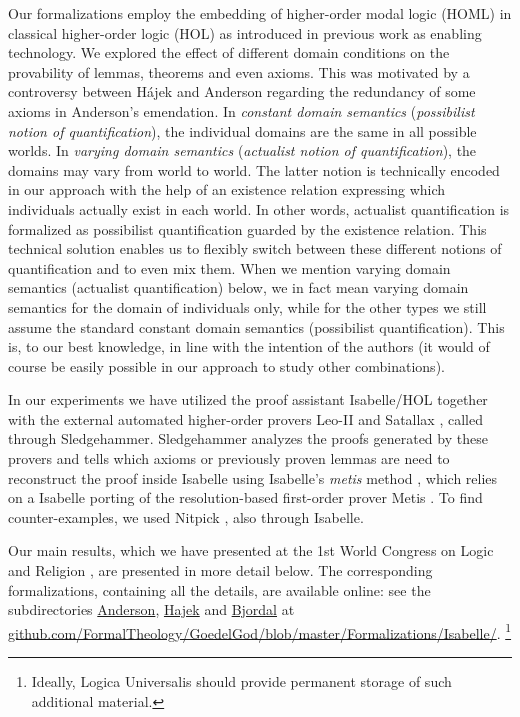 \documentclass{birkjour}
\theoremstyle{definition}
\theoremstyle{remark}
\numberwithin{equation}{section}
\begin{document}
Our formalizations employ the embedding of higher-order modal logic
(HOML) in classical higher-order logic (HOL) as introduced in previous
work \citep{C40,J23} as enabling technology.  We explored the effect
of different domain conditions on the provability of lemmas, theorems
and even axioms.  This was motivated by a controversy between Hájek
and Anderson regarding the redundancy of some axioms in Anderson's
emendation. In \emph{constant domain semantics} (\emph{possibilist
  notion of quantification}), the individual domains are the same in
all possible worlds. In \emph{varying domain semantics}
(\emph{actualist notion of quantification}), the domains may vary from
world to world. The latter notion is technically encoded in our
approach with the help of an existence relation expressing which
individuals actually exist in each world. In other words, actualist
quantification is formalized as possibilist quantification guarded by
the existence relation. This technical solution
enables us to flexibly switch between these different notions of
quantification and to even mix them. When we mention varying
domain semantics (actualist quantification) below, we in fact mean
varying domain semantics for the domain of individuals only, while for
the other types we still assume the standard constant domain semantics
(possibilist quantification).  This is, to our best knowledge, in line 
with the intention of the authors (it would of course be easily
possible in our approach to study other combinations).  

In our
experiments we have utilized the proof assistant Isabelle/HOL
\citep{Isabelle} together with the external automated higher-order provers
Leo-II \citep{Leo-II} and Satallax \citep{Satallax}, called through Sledgehammer. Sledgehammer analyzes the proofs generated by these provers and tells which axioms or previously proven lemmas are need to reconstruct the proof inside Isabelle using Isabelle's \emph{metis} method \citep{PaulsonSusanto}, which relies on a Isabelle porting of the resolution-based first-order prover Metis
\citep{Hurd03first-orderproof}. To find counter-examples, we used Nitpick \citep{Nitpick}, also through Isabelle.

Our main results, which we have
presented at the 1st World Congress on Logic and Religion \citep{C41},
are presented in more detail below. The corresponding formalizations,
containing all the details, are available online: see the
subdirectories \url{Anderson}, \url{Hajek} and \url{Bjordal} at
\url{github.com/FormalTheology/GoedelGod/blob/master/Formalizations/Isabelle/}.
\footnote{Ideally, Logica Universalis should provide
  permanent storage of such additional material.}
\end{document}
